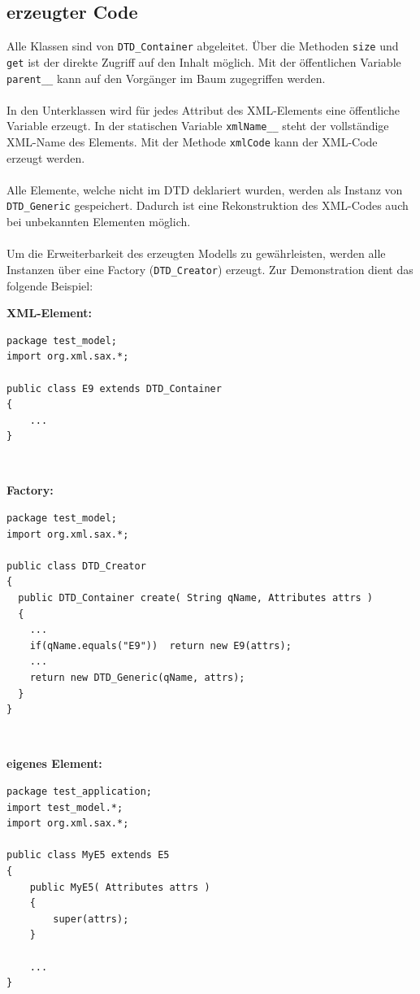 \documentclass [a4paper,11pt] {scrartcl}
\begin{document}
\subsection{erzeugter Code}
Alle Klassen sind von \texttt{DTD\_Container} abgeleitet. {\"U}ber die Methoden \texttt{size}
und \texttt{get} ist der direkte Zugriff auf den Inhalt m{\"o}glich. Mit der {\"o}ffentlichen
Variable \texttt{parent\_\_} kann auf den Vorg{\"a}nger im Baum zugegriffen werden.\\
~\\
In den Unterklassen wird f{\"u}r jedes Attribut des XML-Elements eine {\"o}ffentliche Variable
erzeugt. In der statischen Variable \texttt{xmlName\_\_} steht der vollst{\"a}ndige XML-Name
des Elements. Mit der Methode \texttt{xmlCode} kann der XML-Code erzeugt werden.\\
~\\
Alle Elemente, welche nicht im DTD deklariert wurden, werden als Instanz von
\texttt{DTD\_Generic} gespeichert. Dadurch ist eine Rekonstruktion des XML-Codes
auch bei unbekannten Elementen m{\"o}glich.\\
~\\
Um die Erweiterbarkeit des erzeugten Modells zu gew{\"a}hrleisten, werden alle Instanzen
{\"u}ber eine Factory (\texttt{DTD\_Creator}) erzeugt. Zur Demonstration dient das folgende Beispiel:
~\\[4ex]
\begin{minipage}{\linewidth}
\textbf{XML-Element:}
\begin{verbatim}
package test_model;
import org.xml.sax.*;

public class E9 extends DTD_Container
{
    ...
}
\end{verbatim}
\end{minipage}
~\\[4ex]
\begin{minipage}{\linewidth}
\textbf{Factory:}
\begin{verbatim}
package test_model;
import org.xml.sax.*;

public class DTD_Creator
{
  public DTD_Container create( String qName, Attributes attrs )
  {
    ...
    if(qName.equals("E9"))  return new E9(attrs);
    ...
    return new DTD_Generic(qName, attrs);
  }
}
\end{verbatim}
\end{minipage}
~\\[4ex]
\begin{minipage}{\linewidth}
\textbf{eigenes Element:}
\begin{verbatim}
package test_application;
import test_model.*;
import org.xml.sax.*;

public class MyE5 extends E5
{
    public MyE5( Attributes attrs )
    {
        super(attrs);
    }

    ...
}
\end{verbatim}
\end{minipage}
\end{document}
